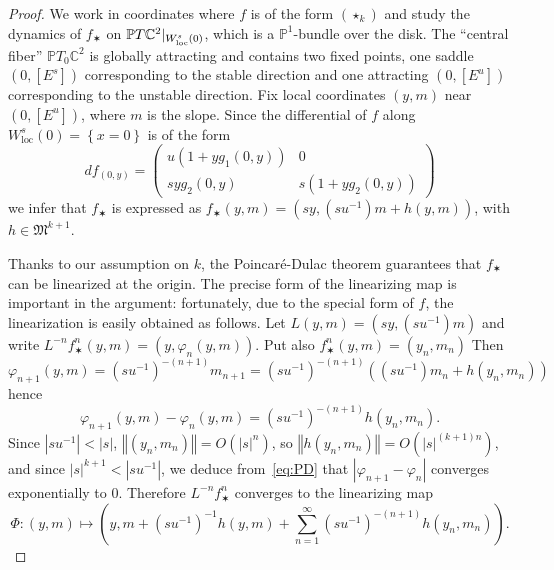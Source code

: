\documentclass[11pt, oneside]{amsart}
\newcommand{\C}{\mathbb{C}}
\renewcommand{\P}{\mathbb{P}}
\newcommand{\set}[1]{\left\{#1\right\}}
\newcommand{\norm}[1]{\left\Vert#1\right\Vert}
\newcommand{\abs}[1]{\left\vert#1\right\vert}
\newcommand{\cd}{{\C^2}}
\newcommand{\rest}[1]{ \arrowvert_{#1}}
\newcommand{\lrpar}[1]{\left(#1\right)}
\newcommand{\loc}{{\mathrm{loc}}}
\newcommand{\inv}{^{-1}}
\theoremstyle{remark}
\theoremstyle{definition}
\theoremstyle{theorem}
\newcommand{\commentaire}[1]{}
\begin{document}
\begin{proof} \commentaire{Proof largely rewritten, cf. Exposition remark \#5.}
We work in coordinates where $f$ is of the form $(\star_k)$ and 
  study the dynamics of $f_\varstar$ on $\P T\C^2\rest{W^s_\loc(0)}$, which is a $\P^1$-bundle over the disk. The ``central fiber'' $\P T_0\cd$ is globally attracting and contains two fixed points, one saddle 
$(0, [E^s])$ corresponding to the stable direction and one attracting $(0, [E^u])$
corresponding to the unstable direction. Fix local coordinates $(y,m)$ near $(0, [E^u])$, where 
$m$ is the slope. Since the differential of $f$ along $W^s_\loc(0) = \set{x=0}$ is of the form 
$$df_{(0,y)}  = 
\begin{pmatrix}
u(1+yg_1(0,y)) & 0 \\
syg_2(0,y) & s(1+yg_2(0,y))
\end{pmatrix} $$ 
we infer that 
$f_\varstar$ 
 is expressed as  $f_\varstar (y,m) = (sy, (  s u\inv) m +h(y,m))$, with $h\in \mathfrak{M}^{k+1}$. 
 
Thanks to our assumption on $k$, the Poincaré-Dulac theorem guarantees that 
$f_\varstar$ can be linearized at the origin. The precise form 
of the linearizing map is important in the argument: fortunately, due to the special form of $f$, 
the linearization is easily obtained as follows.  Let 
$L(y,m) = (sy,(su\inv)m)$ and write $L^{-n}f_\varstar^n (y,m) = (y, \varphi_n(y,m))$. Put also 
$f_\varstar^n (y,m) = (y_n, m_n)$
Then 
\begin{equation}
\varphi_{n+1}(y,m)= (su\inv)^{-(n+1)}  m_{n+1} 
= (su\inv)^{-(n+1)} \lrpar{(su\inv)m_n + h(y_n, m_n)}
\end{equation} hence
\begin{equation}\label{eq:PD}
\varphi_{n+1}(y,m)  - \varphi_n(y,m) = (su\inv)^{-(n+1)} h(y_n, m_n).
\end{equation}
Since $\abs{su\inv}<\abs{s}$, $\norm{(y_n, m_n)} = O(\abs{s}^n)$, so 
$\norm{h(y_n, m_n)} = O(\abs{s}^{(k+1)n})$, and since  
$\abs{s}^{k+1}< \abs{su\inv}$,  we deduce from~\eqref{eq:PD} that 
$\abs{\varphi_{n+1} - \varphi_n}$ converges exponentially to 0. Therefore 
$L^{-n}f_\varstar^n$ converges to the linearizing map  
\begin{equation}\label{eq:PD2}
\Phi \colon (y,m)\longmapsto %
  \lrpar{y, m+ (su\inv)\inv h(y,m) + \sum_{n=1}^\infty (su\inv)^{-(n+1)} h(y_n, m_n)} .
\end{equation}
 

\end{proof}
\end{document}
